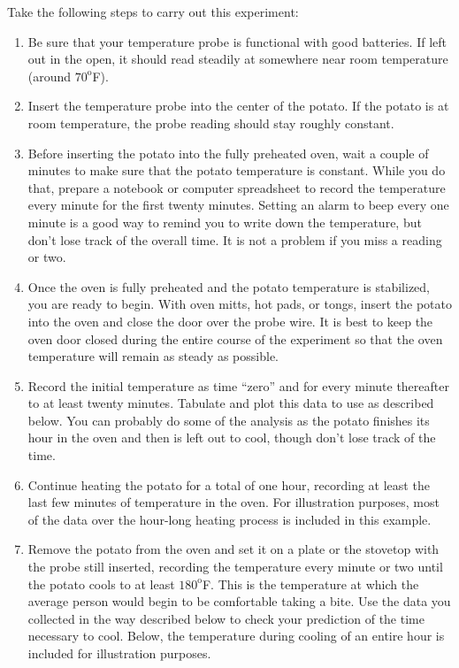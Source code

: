 \documentclass{ximera}
\begin{document}
Take the following steps to carry out this experiment:
\begin{enumerate}
\item Be sure that your temperature probe is functional with good batteries.  If left out in the open, it should read steadily at somewhere near room temperature (around $70^{\text{o}}$F).
\item Insert the temperature probe into the center of the potato.  If the potato is at room temperature, the probe reading should stay roughly constant. 
\item Before inserting the potato into the fully preheated oven, wait a couple of minutes to make sure that the potato temperature is constant.  While you do that, prepare a notebook or computer spreadsheet to record the temperature every minute for the first twenty minutes.  Setting an alarm to beep every one minute is a good way to remind you to write down the temperature, but don't lose track of the overall time.  It is not a problem if you miss a reading or two.
\item Once the oven is fully preheated and the potato temperature is stabilized, you are ready to begin.  With oven mitts, hot pads, or tongs, insert the potato into the oven and close the door over the probe wire.  It is best to keep the oven door closed during the entire course of the experiment so that the oven temperature will remain as steady as possible.
\item Record the initial temperature as time ``zero'' and for every minute thereafter to at least twenty minutes.  Tabulate and plot this data to use as described below.  You can probably do some of the analysis as the potato finishes its hour in the oven and then is left out to cool, though don't lose track of the time.
\item Continue heating the potato for a total of one hour, recording at least the last few minutes of temperature in the oven. For illustration purposes, most of the data over the hour-long heating process is included in this example.
\item Remove the potato from the oven and set it on a plate or the stovetop with the probe still inserted, recording the temperature every minute or two until the potato cools to at least $180^{\text{o}}$F.  This is the temperature at which the average person would begin to be comfortable taking a bite.  Use the data you collected in the way described below to check your prediction of the time necessary to cool.  Below, the temperature during cooling of an entire hour is included for illustration purposes.
\end{enumerate}
 
\end{document}
